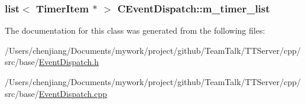 \subsubsection[{m\+\_\+timer\+\_\+list}]{\setlength{\rightskip}{0pt plus 5cm}list$<$ {\bf Timer\+Item} $\ast$ $>$ C\+Event\+Dispatch\+::m\+\_\+timer\+\_\+list\hspace{0.3cm}{\ttfamily [private]}}\label{class_c_event_dispatch_aaff9bf41f63d04ee7b942f86c41ab8c6}


The documentation for this class was generated from the following files\+:\begin{DoxyCompactItemize}
\item 
/\+Users/chenjiang/\+Documents/mywork/project/github/\+Team\+Talk/\+T\+T\+Server/cpp/src/base/\hyperlink{base_2_event_dispatch_8h}{Event\+Dispatch.\+h}\item 
/\+Users/chenjiang/\+Documents/mywork/project/github/\+Team\+Talk/\+T\+T\+Server/cpp/src/base/\hyperlink{base_2_event_dispatch_8cpp}{Event\+Dispatch.\+cpp}\end{DoxyCompactItemize}

